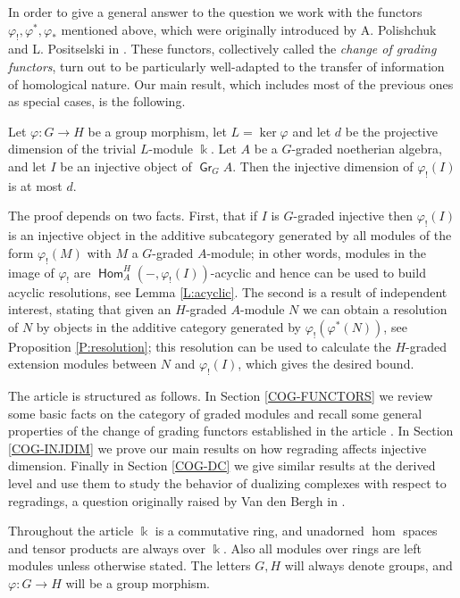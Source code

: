 \documentclass[11pt,fleqn]{article}
\renewcommand\to{\longrightarrow}
\renewcommand\phi{\varphi}
\renewcommand\k{\Bbbk}
\DeclareMathOperator\Gr{\mathsf{Gr}}
\DeclareMathOperator\Hom{\mathsf{Hom}}
\begin{document}
In order to give a general answer to the question we work with the functors 
$\phi_!, \phi^*, \phi_*$ mentioned above, which were originally introduced by 
A. Polishchuk and L. Positselski in \cite{PP-secondHH}. These functors, 
collectively called the \emph{change of 
grading functors}, turn out to be particularly well-adapted to the transfer of 
information of homological nature. Our main result, which includes most of the 
previous ones as special cases, is the following.
\begin{Theorem*}
Let $\phi: G \to H$ be a group morphism, let $L = \ker \phi$ and let $d$ be 
the projective dimension of the trivial $L$-module $\k$. Let $A$ be a 
$G$-graded noetherian algebra, and let $I$ be an injective object of $\Gr_G 
A$. Then the injective dimension of $\phi_!(I)$ is at most $d$. 
\end{Theorem*}
The proof depends on two facts. First, that if $I$ is 
$G$-graded injective then $\phi_!(I)$ is an injective object in the additive 
subcategory generated by all modules of the form $\phi_!(M)$ with $M$ a 
$G$-graded $A$-module; in other words, modules in the image of $\phi_!$ are 
$\Hom_A^H(-,\phi_!(I))$-acyclic and hence can be used to build acyclic 
resolutions, see Lemma \ref{L:acyclic}. The second is a result of independent 
interest, stating that given an $H$-graded $A$-module $N$ we can obtain a 
resolution of $N$ by objects in the additive category generated by 
$\phi_!(\phi^*(N))$, see Proposition \ref{P:resolution}; this resolution 
can be used to calculate the $H$-graded extension modules between $N$ and 
$\phi_!(I)$, which gives the desired bound. 

\bigskip
The article is structured as follows. In Section \ref{COG-FUNCTORS} we review 
some basic facts on the category of graded modules and recall some general 
properties of the change of grading functors established in the article 
\cite{RZ-twisted}. In Section \ref{COG-INJDIM} we 
prove our main results on how regrading affects injective dimension. Finally 
in Section \ref{COG-DC} we give similar results at the derived level and use 
them to study the behavior of dualizing complexes with respect to regradings,
a question originally raised by Van den Bergh in \cite{VdB-existence-dc}.

\bigskip
Throughout the article $\k$ is a commutative ring, and unadorned $\hom$ 
spaces and tensor products are always over $\k$. Also all modules over rings
are left modules unless otherwise stated. The letters $G, H$ will always denote
groups, and $\phi: G \to H$ will be a group morphism.
\end{document}
